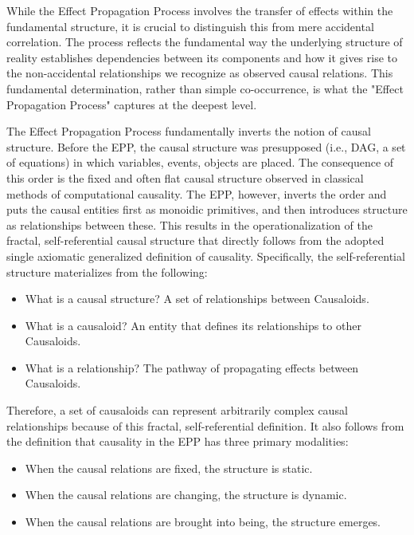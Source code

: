 While the Effect Propagation Process involves the transfer of effects within the fundamental structure, it is crucial to distinguish this from mere accidental correlation. The process reflects the fundamental way the underlying structure of reality establishes dependencies between its components and how it gives rise to the non-accidental relationships we recognize as observed causal relations. This fundamental determination, rather than simple co-occurrence, is what the "Effect Propagation Process" captures at the deepest level.

 The Effect Propagation Process fundamentally inverts the notion of causal structure. Before the EPP, the causal structure was presupposed (i.e., DAG, a set of equations) in which variables, events, objects are placed. The consequence of this order is the fixed and often flat causal structure observed in classical methods of computational causality. The EPP, however, inverts the order and puts the causal entities first as monoidic primitives, and then introduces structure as relationships between these. This results in the operationalization of the fractal, self-referential causal structure that directly follows from the adopted single axiomatic generalized definition of causality. Specifically, the self-referential structure materializes from the following:

\begin{itemize}
	\item What is a causal structure? A set of relationships between Causaloids.
 	\item What is a causaloid? An entity that defines its relationships to other Causaloids. 
	\item What is a relationship? The pathway of propagating effects between Causaloids.
\end{itemize}

Therefore, a set of causaloids can represent arbitrarily complex causal relationships because of this fractal, self-referential definition. It also follows from the definition that causality in the EPP has three primary modalities:
\begin{itemize}
	\item When the causal relations are fixed, the structure is static.
 	\item When the causal relations are changing, the structure is dynamic. 
 	\item When the causal relations are brought into being, the structure emerges. 
\end{itemize}

